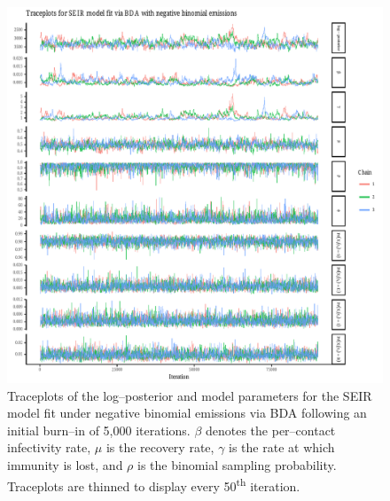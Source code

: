 \begin{figure}[htbp]
	\centering
	\includegraphics[width=\linewidth]{figures/bbs_seir_bda_negbinom_traceplots.pdf}
	\caption{Traceplots of the log--posterior and model parameters for the SEIR model fit under negative binomial emissions via BDA following an initial burn--in of 5,000 iterations. $ \beta $ denotes the per--contact infectivity rate, $ \mu $ is the recovery rate, $ \gamma $ is the rate at which immunity is lost, and $ \rho $ is the binomial sampling probability. Traceplots are thinned to display every 50\textsuperscript{th} iteration.}
	\label{fig:bbs_seir_bda_negbinom_traceplots}
\end{figure}

